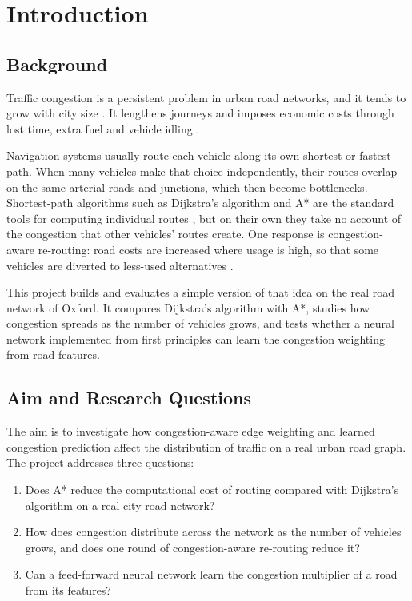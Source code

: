 \documentclass[12pt]{report}
\begin{document}
\tableofcontents
\listoffigures
\listoftables


\chapter{Introduction}

\section{Background}

Traffic congestion is a persistent problem in urban road networks, and it tends to grow with city size \citep{chang2017traffic}. It lengthens journeys and imposes economic costs through lost time, extra fuel and vehicle idling \citep{calatayud2021congestion}.

Navigation systems usually route each vehicle along its own shortest or fastest path. When many vehicles make that choice independently, their routes overlap on the same arterial roads and junctions, which then become bottlenecks. Shortest-path algorithms such as Dijkstra's algorithm and A* are the standard tools for computing individual routes \citep{foead2021astar}, but on their own they take no account of the congestion that other vehicles' routes create. One response is congestion-aware re-routing: road costs are increased where usage is high, so that some vehicles are diverted to less-used alternatives \citep{angelelli2016proactive}.

This project builds and evaluates a simple version of that idea on the real road network of Oxford. It compares Dijkstra's algorithm with A*, studies how congestion spreads as the number of vehicles grows, and tests whether a neural network implemented from first principles can learn the congestion weighting from road features.

\section{Aim and Research Questions}

The aim is to investigate how congestion-aware edge weighting and learned congestion prediction affect the distribution of traffic on a real urban road graph. The project addresses three questions:

\begin{enumerate}
  \item[\textbf{RQ1}] Does A* reduce the computational cost of routing compared with Dijkstra's algorithm on a real city road network?
  \item[\textbf{RQ2}] How does congestion distribute across the network as the number of vehicles grows, and does one round of congestion-aware re-routing reduce it?
  \item[\textbf{RQ3}] Can a feed-forward neural network learn the congestion multiplier of a road from its features?
\end{enumerate}
\end{document}
